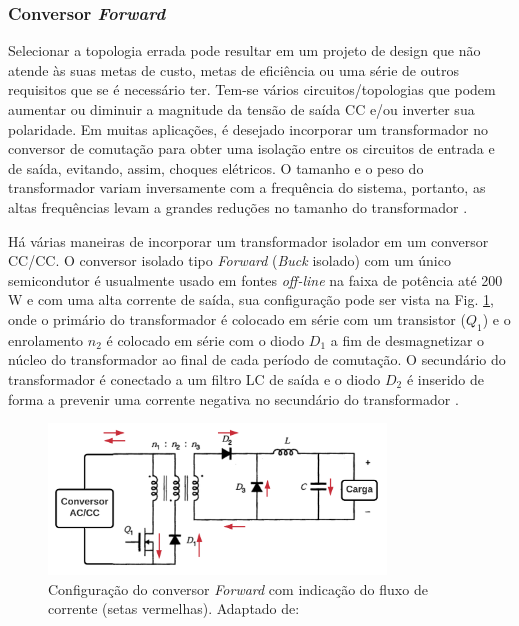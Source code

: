 \subsubsection*{Conversor \textit{Forward}}

Selecionar a topologia errada pode resultar em um projeto de design que não atende às suas metas de custo, metas de eficiência ou uma série de outros requisitos que se é necessário ter. Tem-se vários circuitos/topologias que podem aumentar ou diminuir a magnitude da tensão de saída CC e/ou inverter sua polaridade. Em muitas aplicações, é desejado incorporar um transformador no conversor de comutação para obter uma isolação entre os circuitos de entrada e de saída, evitando, assim, choques elétricos. O tamanho e o peso do transformador variam inversamente com a frequência do sistema, portanto, as altas frequências levam a grandes reduções no tamanho do transformador \cite{forward}.

Há várias maneiras de incorporar um transformador isolador em um conversor CC/CC. O conversor isolado tipo \textit{Forward} (\textit{Buck} isolado) com um único semicondutor é usualmente usado em fontes \textit{off-line} na faixa de potência até 200 W e com uma alta corrente de saída, sua configuração pode ser vista na Fig. \ref{fig:energia_forward}, onde o primário do transformador é colocado em série com um transistor ($Q_{1}$) e o enrolamento $n_{2}$ é colocado em série com o diodo $D_{1}$ a fim de desmagnetizar o núcleo do transformador ao final de cada período de comutação. O secundário do transformador é conectado a um filtro LC de saída e o diodo $D_{2}$ é inserido de forma a prevenir uma corrente negativa no secundário do transformador  \cite{Conversores}.

\begin{figure}[H]
\centering
    \includegraphics[width=0.8\textwidth]{figuras/energia/circuitos/Energia_forward.png}
    \caption{Configuração do conversor  \textit{Forward} com indicação do fluxo de corrente (setas vermelhas). Adaptado de: \cite{forward}}
    \label{fig:energia_forward}
\end{figure}

